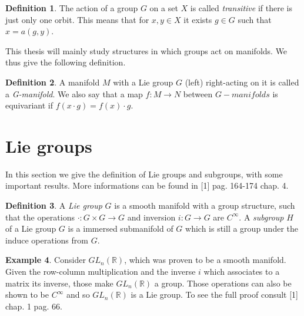 \documentclass[12pt,a4paper]{report}
\theoremstyle{definition}
\newtheorem{Def}{Definition}[chapter]
\theoremstyle{Theorem}
\theoremstyle{definition}
\newtheorem{Ex}[Def]{Example}
\theoremstyle{definition}
\begin{document}
	\begin{Def}
		The action of a group $G$ on a set $X$ is called \textit{transitive} if there is just only one orbit. This means that for $x,y\in X$ it exists $g\in G$ such that $x=a(g,y)$.
	\end{Def}
	This thesis will mainly study structures in which groups act on manifolds. We thus give the following definition.
	\begin{Def}
		A manifold $M$ with a Lie group $G$ (left) right-acting on it is called a \textit{G-manifold}. We also say that a map $f:M\rightarrow N$ between $G-manifolds$ is equivariant if $f(x\cdot g)=f(x)\cdot g$.
	\end{Def}		
	\section{Lie groups}
	In this section we give the definition of Lie groups and subgroups, with some important results. More informations can be found in [1] pag. 164-174 chap. 4.
	\begin{Def}
		A \textit{Lie group} $G$ is a smooth manifold with a group structure, such that the operations $\cdot:G\times G\rightarrow G$ and inversion $i:G\rightarrow G$ are $C^\infty$.
		A \textit{subgroup} $H$ of a Lie group $G$ is a immersed submanifold of $G$ which is still a group under the induce operations from $G$.
	\end{Def}
	\begin{Ex}
		Consider $GL_n(\mathbb{R})$, which was proven to be a smooth manifold. Given the row-column multiplication and the inverse $i$ which associates to a matrix its inverse, those make $GL_n(\mathbb{R})$ a group. Those operations can also be shown to be $C^\infty$ and so $GL_n(\mathbb{R})$ is a Lie group. To see the full proof consult [1] chap. 1 pag. 66.
	\end{Ex}
\end{document}
